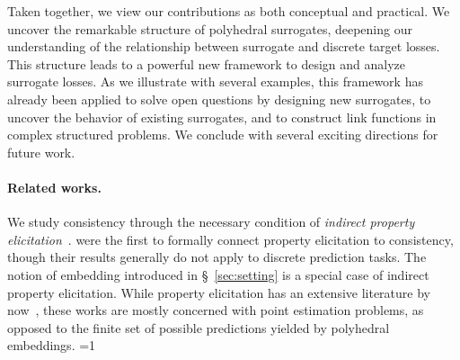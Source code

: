 \documentclass[11pt]{article}
\newcommand{\Comments}{1}
\newcommand{\mytodo}[2]{\ifnum\Comments=1%
  \todo[linecolor=#1!80!black,backgroundcolor=#1,bordercolor=#1!80!black]{#2}\fi}
\newcommand{\jessiet}[1]{\mytodo{teal!20!white}{JF: #1}}
\begin{document}
Taken together, we view our contributions as both conceptual and practical.
We uncover the remarkable structure of polyhedral surrogates, deepening our understanding of the relationship between surrogate and discrete target losses.
This structure leads to a powerful new framework to design and analyze surrogate losses.
As we illustrate with several examples, this framework has already been applied to solve open questions by designing new surrogates, to uncover the behavior of existing surrogates, and to construct link functions in complex structured problems.
We conclude with several exciting directions for future work.



\paragraph{Related works.}

We study consistency through the necessary condition of \emph{indirect property elicitation}~\citep{finocchiaro2021unifying,frongillo2015elicitation}.
\citet{agarwal2015consistent} were the first to formally connect property elicitation to consistency, though their results generally do not apply to discrete prediction tasks.
The notion of embedding introduced in \S~\ref{sec:setting} is a special case of indirect property elicitation.
While property elicitation has an extensive literature by now~\citep{savage1971elicitation,osband1985information-eliciting,lambert2008eliciting,gneiting2011making,steinwart2014elicitation,frongillo2015vector-valued,fissler2016higher,lambert2018elicitation}, these works are mostly concerned with point estimation problems, as opposed to the finite set of possible predictions yielded by polyhedral embeddings. \jessiet{Not sure how to phrase this.}
\end{document}
